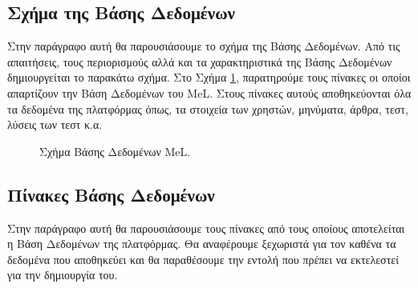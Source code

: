 \subsection{Σχήμα της Βάσης Δεδομένων}
Στην παράγραφο αυτή θα παρουσιάσουμε το σχήμα της Βάσης Δεδομένων. Από τις απαιτήσεις, τους περιορισμούς αλλά και τα χαρακτηριστικά της Βάσης Δεδομένων δημιουργείται το παρακάτω σχήμα. Στο Σχήμα \ref{fig:schemaDB}, παρατηρούμε τους πίνακες οι οποίοι απαρτίζουν την Βάση Δεδομένων του \textlatin{MeL.} Στους πίνακες αυτούς αποθηκεύονται όλα τα δεδομένα της πλατφόρμας όπως, τα στοιχεία των χρηστών, μηνύματα, άρθρα, τεστ, λύσεις των τεστ κ.α. 


\begin{figure}[t]
\caption{Σχήμα Βάσης Δεδομένων \textlatin{MeL.}}
\label{fig:schemaDB}
\end{figure}

\subsection{Πίνακες Βάσης Δεδομένων}
Στην παράγραφο αυτή θα παρουσιάσουμε τους πίνακες από τους οποίους αποτελείται η Βάση Δεδομένων της πλατφόρμας. Θα αναφέρουμε ξεχωριστά για τον καθένα τα δεδομένα που αποθηκεύει και θα παραθέσουμε την εντολή που πρέπει να εκτελεστεί για την δημιουργία του.

